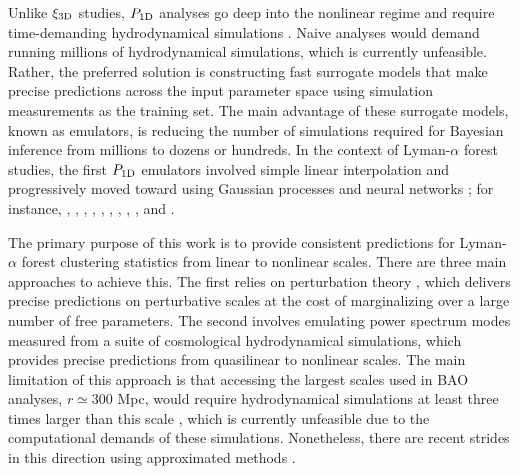 \documentclass[longauth]{aa}
\newcommand{\lyaf}{Lyman-$\alpha$ forest\xspace}
\newcommand{\poned}{\ensuremath{P_{\rm 1D}}\xspace}
\newcommand{\xithreed}{\ensuremath{\xi_{\rm 3D}}\xspace}
\begin{document}
Unlike \xithreed studies, \poned analyses go deep into the nonlinear regime and require time-demanding hydrodynamical simulations \citep[e.g.,][]{hydro_Cen1994, hydro_Miralda1996, hydro_Meiksin2001, hydro_Lukic2015, bolton2017SherwoodSimulationSuite, hydro_Walther2021, hydro_Chabanier2023, Puchwein2023, bird2023PRIYANewSuite}. Naive analyses would demand running millions of hydrodynamical simulations, which is currently unfeasible. Rather, the preferred solution is constructing fast surrogate models that make precise predictions across the input parameter space using simulation measurements as the training set. The main advantage of these surrogate models, known as emulators, is reducing the number of simulations required for Bayesian inference from millions to dozens or hundreds. In the context of \lyaf studies, the first \poned emulators involved simple linear interpolation \citep{mcdonald2006LyaForestPowera} and progressively moved toward using Gaussian processes \citep[GPs;][]{sacks1989DesignAnalysisComputer, mackay1998introduction} and neural networks \citep[NNs;][]{mcculloch1943logical}; for instance, \citet{emugp_bird2019}, \citet{emugp_rogers2019}, \citet{emugp_Walther2019}, \citet{Pedersen2021}, \citet{emugp_Takhtaganov2021}, \citet{emugp_rogers2021}, \citet{gpemu:P1DFernandez2022}, \citet{bird2023PRIYANewSuite}, \citet{ennemu:P1DMolaro2023}, and \citet{cabayol-garcia2023NeuralNetworkEmulator}.

The primary purpose of this work is to provide consistent predictions for \lyaf clustering statistics from linear to nonlinear scales. There are three main approaches to achieve this. The first relies on perturbation theory \citep[e.g.,][]{GivansHirata2020, ChenVlah2021, Ivanov2024}, which delivers precise predictions on perturbative scales at the cost of marginalizing over a large number of free parameters. The second involves emulating power spectrum modes measured from a suite of cosmological hydrodynamical simulations, which provides precise predictions from quasilinear to nonlinear scales. The main limitation of this approach is that accessing the largest scales used in BAO analyses, $r\simeq300$ Mpc, would require hydrodynamical simulations at least three times larger than this scale \citep[e.g.,][]{Angulo2008}, which is currently unfeasible due to the computational demands of these simulations. Nonetheless, there are recent strides in this direction using approximated methods \citep[e.g.,][]{jacobus2023ReconstructingLyaFields}.
\end{document}
